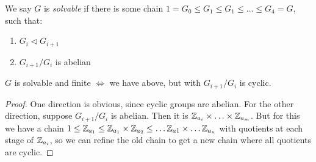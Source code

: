 \documentclass[10pt,a4paper]{article}
\begin{document}
We say $G$ is \emph{solvable} if there is some chain $1 = G_0 \leq G_1 \leq G_1 \leq \ldots \leq G_4 = G$, such that:
\begin{enumerate}
\item $G_i \triangleleft G_{i+1}$
\item $G_{i+1}/G_{i}$ is abelian
\end{enumerate}

\begin{lemma}
$G$ is solvable and finite $\iff$ we have above, but with $G_{i+1}/G_{i}$ is cyclic.
\end{lemma}
\begin{proof}
One direction is obvious, since cyclic groups are abelian. For the other direction, suppose $G_{i+1}/G_i$ is abelian. Then it is $\mathbb{Z}_{a_i} \times \ldots \times \mathbb{Z}_{a_m}$. But for this we have a chain $1 \leq \mathbb{Z}_{a_1} \leq \mathbb{Z}_{a_1}\times \mathbb{Z}_{a_2} \leq \ldots \mathbb{Z}_{a1} \times \ldots \mathbb{Z}_{a_n}$ with quotients at each stage of $\mathbb{Z}_{a_i}$, so we can refine the old chain to get a new chain where all quotients are cyclic.
\end{proof}
\end{document}

